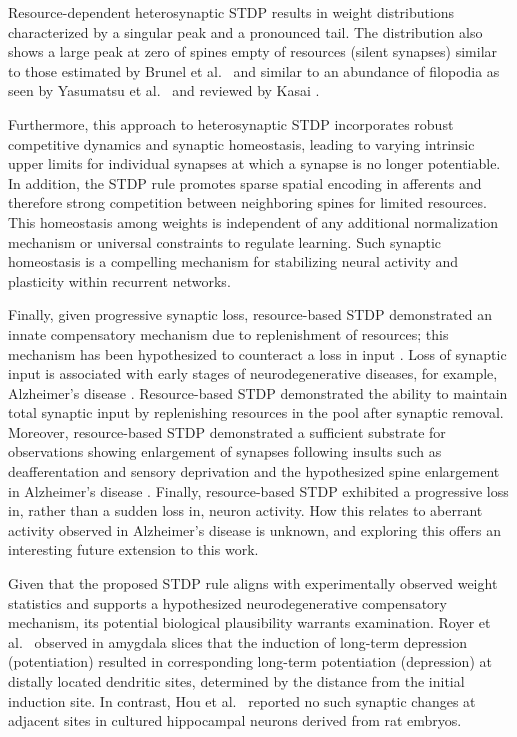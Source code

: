 \documentclass[utf8]{FrontiersinHarvard} %
\begin{document}
Resource-dependent heterosynaptic STDP results in weight distributions characterized by a singular peak and a pronounced tail. The distribution also shows a large peak at zero of spines empty of resources (silent synapses) similar to those estimated by Brunel et al.~\citeyearpar{Brunel.2004} and similar to an abundance of filopodia as seen by Yasumatsu et al.~\citeyearpar{Yasumatsu.2008g4n} and reviewed by Kasai \citeyearpar{KASAI.20239m}.

Furthermore, this approach to heterosynaptic STDP incorporates robust competitive dynamics and synaptic homeostasis, leading to varying intrinsic upper limits for individual synapses at which a synapse is no longer potentiable. In addition, the STDP rule promotes sparse spatial encoding in afferents and therefore strong competition between neighboring spines for limited resources. This homeostasis among weights is independent of any additional normalization mechanism or universal constraints to regulate learning. Such synaptic homeostasis is a compelling mechanism for stabilizing neural activity and plasticity within recurrent networks.

Finally, given progressive synaptic loss, resource-based STDP demonstrated an innate compensatory mechanism due to replenishment of resources; this mechanism has been hypothesized to counteract a loss in input \citep{Bhembre.2023}. Loss of synaptic input is associated with early stages of neurodegenerative diseases, for example, Alzheimer's disease \citep{Spires.2005}. Resource-based STDP demonstrated the ability to maintain total synaptic input by replenishing resources in the pool after synaptic removal. Moreover, resource-based STDP demonstrated a sufficient substrate for observations showing enlargement of synapses following insults such as deafferentation and sensory deprivation \citep{Chen.1982,Barnes.2017d2} and the hypothesized spine enlargement in Alzheimer's disease \citep{Bhembre.2023}. Finally, resource-based STDP exhibited a progressive loss in, rather than a sudden loss in, neuron activity. How this relates to aberrant activity observed in Alzheimer's disease \citep{Korzhova.2021} is unknown, and exploring this offers an interesting future extension to this work.

Given that the proposed STDP rule aligns with experimentally observed weight statistics and supports a hypothesized neurodegenerative compensatory mechanism, its potential biological plausibility warrants examination. Royer et al.~\citeyearpar{Royer.2003} observed in amygdala slices that the induction of long-term depression (potentiation) resulted in corresponding long-term potentiation (depression) at distally located dendritic sites, determined by the distance from the initial induction site. In contrast, Hou et al.~\citeyearpar{Hou.2008} reported no such synaptic changes at adjacent sites in cultured hippocampal neurons derived from rat embryos.
\end{document}
